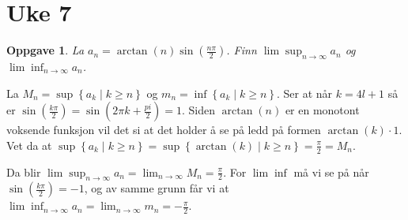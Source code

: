 \documentclass[a4paper]{article}
\newtheorem{prb}{Oppgave}
\begin{document}
\section{Uke 7}
\begin{prb}
  La $a_n = \arctan\left( n \right)\sin\left( \frac{n\pi}{2} \right)$.
  Finn $\lim\sup_{n\rightarrow\infty}a_n$ og $\lim\inf_{n\rightarrow\infty}a_n$.
\end{prb}
La $M_{n} = \sup \left\{ a_k \mid k \geq n \right\}$ og $m_n = \inf\left\{ a_k \mid k\geq n \right\}$.
Ser at når $k = 4l+1$ så er $\sin\left( \frac{k\pi}{2}\right) = \sin\left( 2\pi k + \frac{pi}{2} \right) = 1$.
Siden $\arctan(n)$ er en monotont voksende funksjon vil det si at det holder å se på ledd på formen
$\arctan\left( k \right) \cdot 1$. Vet da at $\sup\left\{ a_k \mid k\geq n \right\} = \sup\left\{ \arctan\left( k \right)\mid k\geq n \right\} = \frac{\pi}{2} = M_n$.

Da blir $\lim\sup_{n\rightarrow\infty} a_n = \lim_{n \rightarrow \infty} M_n = \frac{\pi}{2}$.
For $\lim\inf$ må vi se på når $\sin\left( \frac{k\pi}{2} \right) = -1$, og av samme grunn får vi at
$\lim\inf_{n\rightarrow\infty}a_n = \lim_{n \rightarrow \infty} m_n = -\frac{\pi}{2}$.
\end{document}
